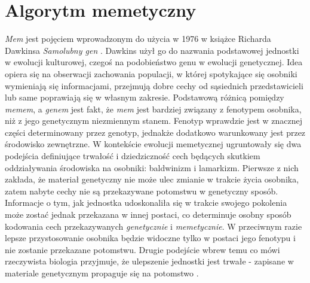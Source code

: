 \section{Algorytm memetyczny}
%
\par
\emph{Mem} jest pojęciem wprowadzonym do użycia w 1976 w książce Richarda Dawkinsa \emph{Samolubny gen} \cite{dawkins2011}. Dawkins użył go do nazwania podstawowej jednostki w ewolucji kulturowej, czegoś na podobieństwo genu w ewolucji genetycznej. Idea opiera się na obserwacji zachowania populacji, w której spotykające się osobniki wymieniają się informacjami, przejmują dobre cechy od sąsiednich przedstawicieli lub same poprawiają się w własnym zakresie. Podstawową różnicą pomiędzy \emph{memem}, a \emph{genem} jest fakt, że \emph{mem} jest bardziej związany z fenotypem osobnika, niż z jego genetycznym niezmiennym stanem. Fenotyp wprawdzie jest w znacznej części determinowany przez genotyp, jednakże dodatkowo warunkowany jest przez środowisko zewnętrzne. W kontekście ewolucji memetycznej ugruntowały się dwa podejścia definiujące trwałość i dziedziczność cech będących skutkiem oddziaływania środowiska na osobniki: baldwinizm i lamarkizm. Pierwsze z nich zakłada, że materiał genetyczny nie może ulec zmianie w trakcie życia osobnika, zatem nabyte cechy nie są przekazywane potomstwu w genetyczny sposób. Informacje o tym, jak jednostka udoskonaliła się w trakcie swojego pokolenia może zostać jednak przekazana w innej postaci, co determinuje osobny sposób kodowania cech przekazywanych \emph{genetycznie} i \emph{memetycznie}. W przeciwnym razie lepsze przystosowanie osobnika będzie widoczne tylko w postaci jego fenotypu i nie zostanie przekazane potomstwu. Drugie podejście wbrew temu co mówi rzeczywista biologia przyjmuje, że ulepszenie jednostki jest trwałe - zapisane w materiale genetycznym propaguje się na potomstwo \cite{whitley1994lamarckian}.
\par
